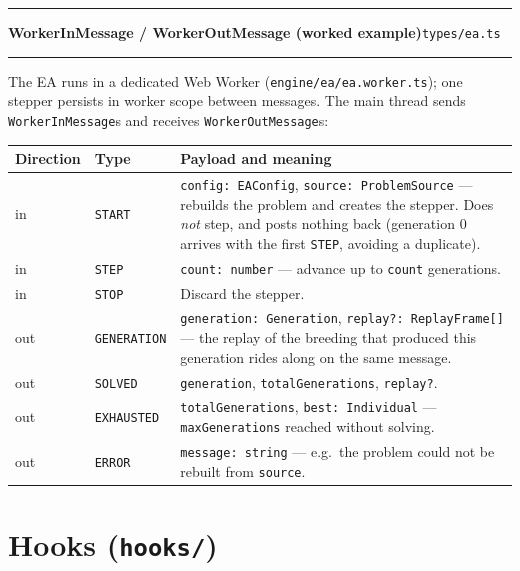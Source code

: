 \documentclass[11pt,a4paper]{report}
\newcommand{\srcfile}[1]{\texttt{\small #1}}   %
\newcommand{\ts}[1]{\texttt{#1}}               %
\newenvironment{apientry}[2]{%
  \par\medskip\noindent
  \begin{minipage}{\textwidth}
  \hrule\vspace{0.6ex}
  {\large\ttfamily\bfseries #1}\hfill{\footnotesize\srcfile{#2}}
  \vspace{0.4ex}\hrule\medskip
}{%
  \end{minipage}\par\medskip
}
\begin{document}
\begin{apientry}{WorkerInMessage / WorkerOutMessage (worked example)}{types/ea.ts}
The EA runs in a dedicated Web Worker
(\srcfile{engine/ea/ea.worker.ts}); one stepper persists in worker scope
between messages. The main thread sends \ts{WorkerInMessage}s and receives
\ts{WorkerOutMessage}s:

\begin{center}
\begin{tabularx}{\textwidth}{l l X}
  \toprule
  \textbf{Direction} & \textbf{Type} & \textbf{Payload and meaning} \\
  \midrule
  in  & \ts{START} & \ts{config: EAConfig}, \ts{source: ProblemSource} ---
        rebuilds the problem and creates the stepper. Does \emph{not}
        step, and posts nothing back (generation 0 arrives with the first
        \ts{STEP}, avoiding a duplicate). \\
  in  & \ts{STEP}  & \ts{count: number} --- advance up to \ts{count}
        generations. \\
  in  & \ts{STOP}  & Discard the stepper. \\
  out & \ts{GENERATION} & \ts{generation: Generation},
        \ts{replay?: ReplayFrame[]} --- the replay of the breeding that
        produced this generation rides along on the same message. \\
  out & \ts{SOLVED} & \ts{generation}, \ts{totalGenerations},
        \ts{replay?}. \\
  out & \ts{EXHAUSTED} & \ts{totalGenerations}, \ts{best: Individual} ---
        \ts{maxGenerations} reached without solving. \\
  out & \ts{ERROR} & \ts{message: string} --- e.g.\ the problem could not
        be rebuilt from \ts{source}. \\
  \bottomrule
\end{tabularx}
\end{center}
\end{apientry}

\section{Hooks (\srcfile{hooks/})}
\end{document}

